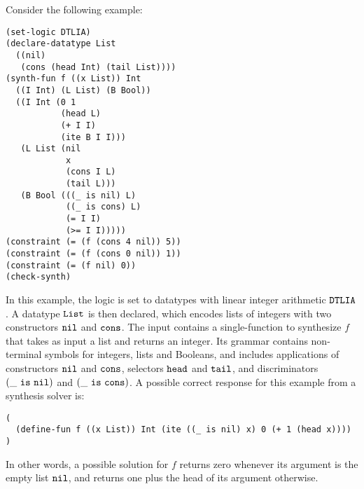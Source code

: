 \documentclass[english,a4paper,10pt]{article}
\begin{document}
\begin{example}
Consider the following example:
\begin{lstlisting}[language=SyGuS]
(set-logic DTLIA)
(declare-datatype List
  ((nil)
   (cons (head Int) (tail List))))
(synth-fun f ((x List)) Int
  ((I Int) (L List) (B Bool))
  ((I Int (0 1 
           (head L)
           (+ I I)
           (ite B I I)))
   (L List (nil
            x
            (cons I L)
            (tail L)))
   (B Bool (((_ is nil) L)
            ((_ is cons) L)
            (= I I)
            (>= I I)))))
(constraint (= (f (cons 4 nil)) 5))
(constraint (= (f (cons 0 nil)) 1))
(constraint (= (f nil) 0))
(check-synth)
\end{lstlisting}
In this example, the logic is set to 
datatypes with linear integer arithmetic ${\tt DTLIA}$.
A datatype ${\tt List}$ is then declared,
which encodes lists of integers with two constructors ${\tt nil}$ and ${\tt cons}$.
The input contains a single-function to synthesize $f$
that takes as input a list and returns an integer.
Its grammar contains non-terminal symbols for integers, lists and Booleans,
and includes applications of constructors ${\tt nil}$ and ${\tt cons}$,
selectors ${\tt head}$ and ${\tt tail}$, and
discriminators ${\tt (\_\ is\ nil)}$ and ${\tt (\_\ is\ cons)}$.
A possible correct response for this example from a synthesis solver is:
\begin{lstlisting}[language=SyGuS]
(
  (define-fun f ((x List)) Int (ite ((_ is nil) x) 0 (+ 1 (head x))))
)
\end{lstlisting}
In other words, a possible solution for $f$ returns zero whenever its
argument is the empty list ${\tt nil}$, 
and returns one plus the head of its argument otherwise.
\end{example}
\end{document}
